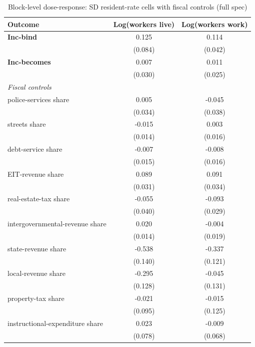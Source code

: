 \begin{table}[!htbp]
  \centering
  \caption{Block-level dose-response: SD resident-rate cells with fiscal controls (full spec)}
  \label{tab:app_full_block_sd_results}
  \footnotesize
  \renewcommand{\arraystretch}{0.9}
  \begin{tabular}{lcc}
    \toprule
    Outcome & Log(workers live) & Log(workers work) \\
    \midrule
    \textbf{Inc-bind} & 0.125 & 0.114\sym{***} \\
                      & (0.084) & (0.042) \\
    \textbf{Inc-becomes} & 0.007 & 0.011 \\
                      & (0.030) & (0.025) \\
    \midrule
    \multicolumn{3}{l}{\textit{Fiscal controls}} \\
    police-services share & 0.005 & -0.045 \\
                      & (0.034) & (0.038) \\
    streets share & -0.015 & 0.003 \\
                      & (0.014) & (0.016) \\
    debt-service share & -0.007 & -0.008 \\
                      & (0.015) & (0.016) \\
    EIT-revenue share & 0.089\sym{***} & 0.091\sym{***} \\
                      & (0.031) & (0.034) \\
    real-estate-tax share & -0.055 & -0.093\sym{***} \\
                      & (0.040) & (0.029) \\
    intergovernmental-revenue share & 0.020 & -0.004 \\
                      & (0.014) & (0.019) \\
    state-revenue share & -0.538\sym{***} & -0.337\sym{***} \\
                      & (0.140) & (0.121) \\
    local-revenue share & -0.295\sym{**} & -0.045 \\
                      & (0.128) & (0.131) \\
    property-tax share & -0.021 & -0.015 \\
                      & (0.095) & (0.125) \\
    instructional-expenditure share & 0.023 & -0.009 \\
                      & (0.078) & (0.068) \\

\end{tabular}
\end{table}

